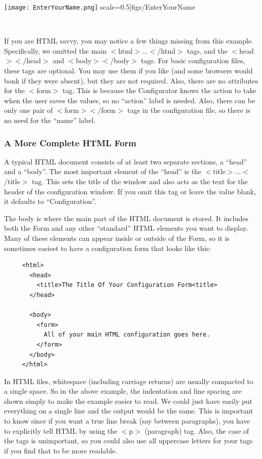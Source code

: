 \texttt{[image: EnterYourName.png]}
  scale=0.5]{figs/EnterYourName}

~


If you are HTML savvy, you may notice a few things missing from this
example. Specifically, we omitted the main $<$html$>$...$<$/html$>$ tags,
and the $<$head$>$$<$/head$>$ and $<$body$>$$<$/body$>$ tags. For basic configuration
files, these tags are optional. You may use them if you like (and
some browsers would bonk if they were absent), but they are not required.
Also, there are no attributes for the $<$form$>$ tag. This is because
the Configurator knows the action to take when the user saves the
values, so no {}``action'' label is needed. Also, there can be only
one pair of $<$form$>$$<$/form$>$ tags in the configuration file, so there
is no need for the {}``name'' label.


\subsubsection*{A More Complete HTML Form}

A typical HTML document consists of at least two separate sections,
a {}``head'' and a {}``body''. The most important element of the
{}``head'' is the $<$title$>$...$<$/title$>$ tag. This sets the title of
the window and also acts as the text for the header of the configuration
window. If you omit this tag or leave the value blank, it defaults
to {}``Configuration''.

The body is where the main part of the HTML document is stored. It
includes both the Form and any other {}``standard'' HTML elements
you want to display. Many of these elements can appear inside or outside
of the Form, so it is sometimes easiest to have a configuration form
that looks like this:

\begin{footnotesize}
\begin{verbatim}
     <html>
       <head>
         <title>The Title Of Your Configuration Form<title>
       </head>

       <body> 
         <form> 
           All of your main HTML configuration goes here.
         </form> 
       </body> 
     </html>
\end{verbatim}
\end{footnotesize}

In HTML files, whitespace (including carriage returns) are usually
compacted to a single space. So in the above example, the indentation
and line spacing are shown simply to make the example easier to read.
We could just have easily put everything on a single line and the
output would be the same. This is important to know since if you want
a true line break (say between paragraphs), you have to explicitly
tell HTML by using the $<$p$>$ (paragraph) tag. Also, the case of the
tags is unimportant, so you could also use all uppercase letters for
your tags if you find that to be more readable.



